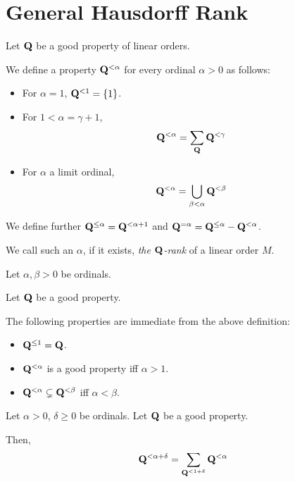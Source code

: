 
\section{General Hausdorff Rank}

\begin{definition}
  Let $\mathbf{Q}$ be a good property of linear orders.

  We define a property $\mathbf{Q}^{< \alpha}$
  for every ordinal $\alpha > 0$ as follows:

  \begin{itemize}
    \item For $\alpha = 1$, $\mathbf{Q}^{< 1} = \left\{ {1} \right\}$.
    \item For $1 < \alpha = \gamma + 1$,
          \[\mathbf{Q}^{< \alpha} = \sum_{\mathbf{Q}}{\mathbf{Q}^{< \gamma}}\]
    \item For $\alpha$ a limit ordinal,
          \[\mathbf{Q}^{< \alpha} = \bigcup_{\beta < \alpha} \mathbf{Q}^{< \beta}\]
  \end{itemize}

  We define further $\mathbf{Q}^{\le \alpha} = \mathbf{Q}^{< \alpha + 1}$
  and $\mathbf{Q}^{= \alpha} = \mathbf{Q}^{\le \alpha} - \mathbf{Q}^{< \alpha}$.

  We call such an $\alpha$, if it exists,
  \emph{the $\mathbf{Q}$-rank} of a linear order $M$.
\end{definition}

\begin{observations}
  Let $\alpha, \beta > 0$ be ordinals.

  Let $\mathbf{Q}$ be a good property.

  The following properties are immediate from the above definition:

  \begin{itemize}
    \item $\mathbf{Q}^{\le 1} = \mathbf{Q}$.
    \item $\mathbf{Q}^{< \alpha}$ is a good property iff $\alpha > 1$.
    \item $\mathbf{Q}^{< \alpha} \subsetneq \mathbf{Q}^{< \beta}$ iff $\alpha < \beta$.
  \end{itemize}
\end{observations}


\begin{lemma}
  Let $\alpha > 0$, $\delta \ge 0$ be ordinals. Let $\mathbf{Q}$ be a good property.

  Then,
  \[
    \mathbf{Q}^{< \alpha + \delta}
    = \sum_{\mathbf{Q}^{< 1 + \delta}}{\mathbf{Q}^{< \alpha}}
  \]
\end{lemma}

